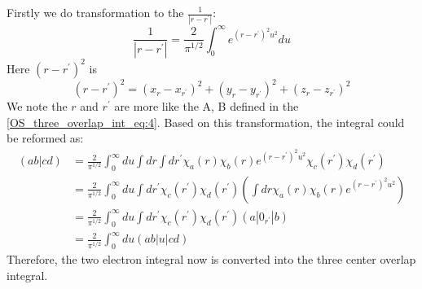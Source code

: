 Firstly we do transformation to the $\frac{1}{|r-r^{'}|}$:
\begin{equation}
 \frac{1}{|r-r^{'}|} = \frac{2}{\pi^{1/2}}\int^{\infty}_{0}
e^{(r-r^{'})^{2}u^{2}}du
\end{equation}
Here $(r-r^{'})^{2}$ is 
\begin{equation}
(r-r^{'})^{2} = (x_{r}-x_{r^{'}})^{2} +  (y_{r}-y_{r^{'}})^{2} +
(z_{r}-z_{r^{'}})^{2}
\end{equation}
We note the $r$ and $r^{'}$ are more like the A, B defined in the 
\ref{OS_three_overlap_int_eq:4}. Based on this transformation,
the integral could be reformed as:
\begin{equation}
 \begin{split}
 (ab|cd) &= \frac{2}{\pi^{1/2}}\int^{\infty}_{0} du 
\int dr \int dr^{'} \chi_{a}(r)\chi_{b}(r) e^{(r-r^{'})^{2}u^{2}}
\chi_{c}(r^{'})\chi_{d}(r^{'}) \\
&= \frac{2}{\pi^{1/2}}\int^{\infty}_{0} du
\int dr^{'}\chi_{c}(r^{'})\chi_{d}(r^{'}) 
\left( \int dr  \chi_{a}(r)\chi_{b}(r) e^{(r-r^{'})^{2}u^{2}}\right) \\ 
&= \frac{2}{\pi^{1/2}}\int^{\infty}_{0} du
\int dr^{'}\chi_{c}(r^{'})\chi_{d}(r^{'})(a|0_{r^{'}}|b) \\
&= \frac{2}{\pi^{1/2}}\int^{\infty}_{0} du (ab|u|cd)
 \end{split}
\label{OS_ERI_eq:2}
\end{equation}
Therefore, the two electron integral now is converted into the three
center overlap integral.


